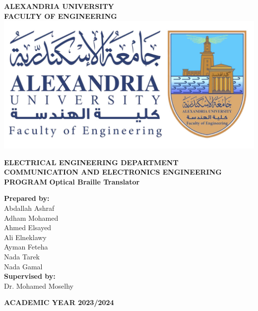 \documentclass[a4paper, 12pt, english]{article}
\begin{document}
\begin{titlepage}
\begin{center}
\textbf{\LARGE ALEXANDRIA UNIVERSITY}\\[0.5cm] 
\textbf{\large FACULTY OF ENGINEERING}\\[0.2cm]
\vspace{20pt}
\includegraphics[scale=0.15]{AlexuLogo.png}\\[1cm]

\par
\textbf{ELECTRICAL ENGINEERING DEPARTMENT}\\
\vspace{15pt}
\textbf{\Large COMMUNICATION AND ELECTRONICS ENGINEERING PROGRAM}
\vspace{15pt}
\myrule[1pt][7pt]
\textbf{\LARGE  Optical Braille Translator}\\
\myrule[1pt][7pt]
\vspace{25pt}

\textbf{\large Prepared by:}\\[0.2cm]

Abdallah Ashraf\\
Adham Mohamed\\
Ahmed Elsayed\\
Ali Elneklawy\\
Ayman Feteha\\
Nada Tarek\\
Nada Gamal\\

\vspace{45pt}
\textbf {\large Supervised by:}\\[0.2cm]
\Large {Dr. Mohamed Moselhy}\\[0.1cm]
\end{center}

\par
\vfill
\begin{center}
\textbf{ACADEMIC YEAR 2023/2024}\\
\end{center}

\end{titlepage}
\end{document}
